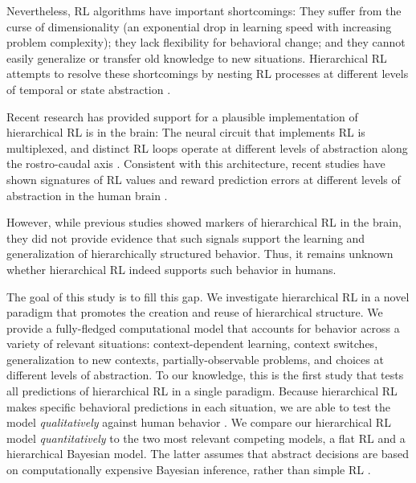 \documentclass[10pt,letterpaper]{article}  %
\newcommand{\rev}{\color{black}}
\begin{document}
Nevertheless, RL algorithms have important shortcomings: They suffer from the curse of dimensionality (an exponential drop in learning speed with increasing problem complexity); they lack flexibility for behavioral change; and they cannot easily generalize or transfer old knowledge to new situations. Hierarchical RL \cite{konidaris_necessity_2019} attempts to resolve these shortcomings by nesting RL processes at different levels of temporal \cite{botvinick_hierarchical_2012, momennejad_successor_2017, ribas_fernandes_neural_2011} or state abstraction \cite{leong_dynamic_2017, farashahi_feature-based_2017}.

Recent research has provided support for a plausible implementation of hierarchical RL is in the brain: The neural circuit that implements RL is multiplexed, and distinct RL loops operate at different levels of abstraction along the rostro-caudal axis \cite{frank_mechanisms_2012, badre_mechanisms_2012, alexander_parallel_1986, alexander_hierarchical_2015, haruno_heterarchical_2006, koechlin_prefrontal_2016, badre_cognitive_2008, badre_is_2009, balleine_hierarchical_2015}. %
Consistent with this architecture, recent studies have shown signatures of RL values and reward prediction errors at different levels of abstraction in the human brain \cite{ribas_fernandes_neural_2011, ribas_fernandes_subgoal-and_2018, diuk_hierarchical_2013}.

{\rev However, while previous studies showed markers of hierarchical RL in the brain, they did not provide evidence that such signals support the learning and generalization of hierarchically structured behavior. Thus, it remains unknown whether hierarchical RL indeed supports such behavior in humans.

The goal of this study is to fill this gap. We investigate hierarchical RL in a novel paradigm that promotes the creation and reuse of hierarchical structure. We provide a fully-fledged computational model that accounts for behavior across a variety of relevant situations: context-dependent learning, context switches, generalization to new contexts, partially-observable problems, and choices at different levels of abstraction.
To our knowledge, this is the first study that tests all predictions of hierarchical RL in a single paradigm. Because hierarchical RL makes specific behavioral predictions in each situation, we are able to test the model \textit{qualitatively} against human behavior \cite{palminteri2017importance}. We compare our hierarchical RL model \textit{quantitatively} to the two most relevant competing models, a flat RL and a hierarchical Bayesian model. The latter assumes that abstract decisions are based on computationally expensive Bayesian inference, rather than simple RL \cite{donoso_foundations_2014}.}
\end{document}
